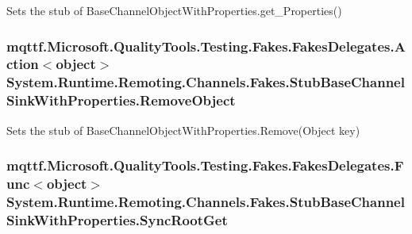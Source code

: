 Sets the stub of Base\-Channel\-Object\-With\-Properties.\-get\-\_\-\-Properties()

\hypertarget{class_system_1_1_runtime_1_1_remoting_1_1_channels_1_1_fakes_1_1_stub_base_channel_sink_with_properties_a5b43268e1ae01a9ff7f97f9256d9932b}{
\subsubsection[{Remove\-Object}]{\setlength{\rightskip}{0pt plus 5cm}mqttf.\-Microsoft.\-Quality\-Tools.\-Testing.\-Fakes.\-Fakes\-Delegates.\-Action$<$object$>$ System.\-Runtime.\-Remoting.\-Channels.\-Fakes.\-Stub\-Base\-Channel\-Sink\-With\-Properties.\-Remove\-Object}}\label{class_system_1_1_runtime_1_1_remoting_1_1_channels_1_1_fakes_1_1_stub_base_channel_sink_with_properties_a5b43268e1ae01a9ff7f97f9256d9932b}


Sets the stub of Base\-Channel\-Object\-With\-Properties.\-Remove(\-Object key)

\hypertarget{class_system_1_1_runtime_1_1_remoting_1_1_channels_1_1_fakes_1_1_stub_base_channel_sink_with_properties_a8896e26fd109beca772adce5141a80e1}{
\subsubsection[{Sync\-Root\-Get}]{\setlength{\rightskip}{0pt plus 5cm}mqttf.\-Microsoft.\-Quality\-Tools.\-Testing.\-Fakes.\-Fakes\-Delegates.\-Func$<$object$>$ System.\-Runtime.\-Remoting.\-Channels.\-Fakes.\-Stub\-Base\-Channel\-Sink\-With\-Properties.\-Sync\-Root\-Get}}\label{class_system_1_1_runtime_1_1_remoting_1_1_channels_1_1_fakes_1_1_stub_base_channel_sink_with_properties_a8896e26fd109beca772adce5141a80e1}


